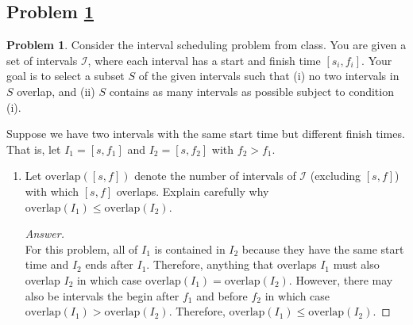 \documentclass[11pt]{article}
\theoremstyle{definition}
\theoremstyle{definition}
\newtheorem{required}{Problem}
\theoremstyle{definition}
\begin{document}
\subsection{Problem \ref{DFS1}}
\begin{required} \label{DFS1}
Consider the interval scheduling problem from class. You are given a set of intervals $\mathcal{I}$, where each interval has a start and finish time $[s_i, f_i]$. Your goal is to select a subset $S$ of the given intervals such that (i) no two intervals in $S$ overlap, and (ii) $S$ contains as many intervals as possible subject to condition (i). 

Suppose we have two intervals with the same start time but different finish times. That is, let $I_{1} = [s, f_{1}]$ and $I_{2} = [s, f_{2}]$ with $f_{2} > f_{1}$. 
\begin{enumerate}[label=(\alph*)]
\item Let $\text{overlap}([s, f])$ denote the number of intervals of $\mathcal{I}$ (excluding $[s, f]$) with which $[s, f]$ overlaps. Explain carefully why $\text{overlap}(I_{1}) \leq \text{overlap}(I_{2})$.
\begin{proof}[Answer] $ $\\
For this problem, all of $I_1$ is contained in $I_2$ because they have the same start time and $I_2$ ends after $I_1$. Therefore, anything that overlaps $I_1$ must also overlap $I_2$ in which case $\text{overlap}(I_{1}) = \text{overlap}(I_{2})$. However, there may also be intervals the begin after $f_1 $ and before $f_2$ in which case $\text{overlap}(I_{1}) > \text{overlap}(I_{2})$. Therefore, $\text{overlap}(I_{1}) \leq \text{overlap}(I_{2})$.
\end{proof}



\end{enumerate}
\end{required}
\end{document}
